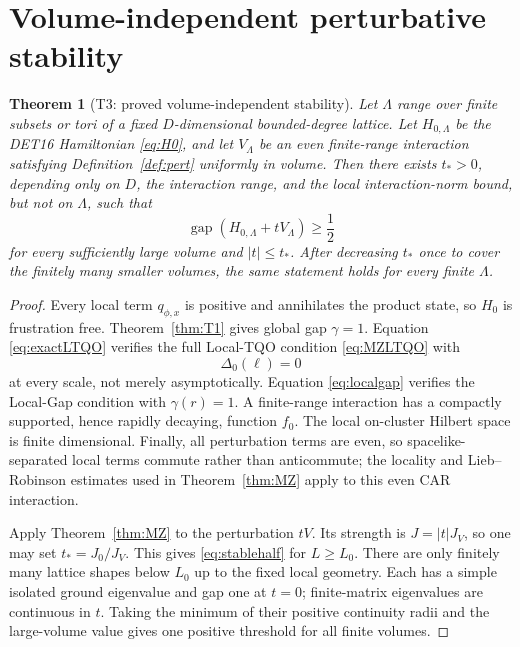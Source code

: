 \documentclass[11pt]{article}
\newtheorem{theorem}{Theorem}[section]
\theoremstyle{remark}
\newcommand{\gap}{\operatorname{gap}}
\begin{document}
\section{Volume-independent perturbative stability}

\begin{theorem}[T3: proved volume-independent stability]
\label{thm:T3}
Let $\Lambda$ range over finite subsets or tori of a fixed
$D$-dimensional bounded-degree lattice.  Let $H_{0,\Lambda}$ be the
DET16 Hamiltonian \eqref{eq:H0}, and let $V_\Lambda$ be an even
finite-range interaction satisfying Definition~\ref{def:pert}
uniformly in volume.  Then there exists $t_*>0$, depending only on
$D$, the interaction range, and the local interaction-norm bound, but
not on $\Lambda$, such that
\[
 \gap(H_{0,\Lambda}+tV_\Lambda)\geq\frac12
\tag{5.1}\label{eq:stablehalf}
\]
for every sufficiently large volume and $|t|\leq t_*$.  After
decreasing $t_*$ once to cover the finitely many smaller volumes, the
same statement holds for every finite $\Lambda$.
\end{theorem}

\begin{proof}
Every local term $q_{\phi,x}$ is positive and annihilates the product
state, so $H_0$ is frustration free.  Theorem~\ref{thm:T1} gives
global gap $\gamma=1$.  Equation \eqref{eq:exactLTQO} verifies the full
Local-TQO condition \eqref{eq:MZLTQO} with
\[
 \Delta_0(\ell)=0
\]
at every scale, not merely asymptotically.  Equation
\eqref{eq:localgap} verifies the Local-Gap condition with
$\gamma(r)=1$.  A finite-range interaction has a compactly supported,
hence rapidly decaying, function $f_0$.  The local on-cluster Hilbert
space is finite dimensional.  Finally, all perturbation terms are
even, so spacelike-separated local terms commute rather than
anticommute; the locality and Lieb--Robinson estimates used in
Theorem~\ref{thm:MZ} apply to this even CAR interaction.

Apply Theorem~\ref{thm:MZ} to the perturbation $tV$.  Its strength is
$J=|t|J_V$, so one may set $t_*=J_0/J_V$.  This gives
\eqref{eq:stablehalf} for $L\geq L_0$.  There are only finitely many
lattice shapes below $L_0$ up to the fixed local geometry.  Each has a
simple isolated ground eigenvalue and gap one at $t=0$; finite-matrix
eigenvalues are continuous in $t$.  Taking the minimum of their
positive continuity radii and the large-volume value gives one
positive threshold for all finite volumes.
\end{proof}
\end{document}

